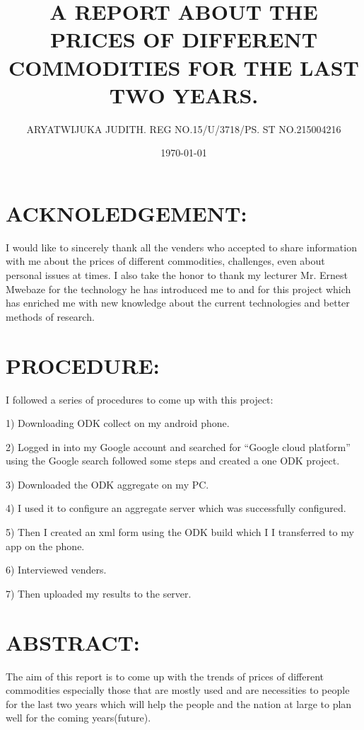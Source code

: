 \documentclass[14pt]{article}
\begin{document}
\title{A REPORT ABOUT THE PRICES OF DIFFERENT COMMODITIES FOR THE LAST TWO YEARS.}
       \author{ ARYATWIJUKA JUDITH.   REG NO.15/U/3718/PS. ST NO.215004216}

\date{\today}
\maketitle
\tableofcontents

\section{ACKNOLEDGEMENT:}
           I would like to sincerely thank all the venders who accepted to share information with me about the prices of different commodities, challenges, even about personal issues at times.
           I also take the honor to thank my lecturer Mr. Ernest Mwebaze for the technology he has introduced me to and for this project which has enriched me with new knowledge about the current technologies and better methods of research.
\section{PROCEDURE:}
I followed a series of procedures to come up with this project:\par
1)	Downloading ODK collect on my android phone.\par
2)	Logged in into my Google account and searched for “Google cloud platform” using the Google search followed some steps and created a one ODK project.\par
3)	Downloaded the ODK aggregate on my PC.\par
4)	I used it to configure an aggregate server which was successfully configured.\par
5)	Then I created an xml form using the ODK build which I I transferred to my app on the phone.\par
6)	Interviewed venders.\par
7)	Then uploaded my results to the server.\par
\section{ABSTRACT:}
The aim of this report is to come up with the trends of prices of different commodities especially those that are mostly used and are necessities to people for the last two years which will help the people and the nation at large to plan well for the coming years(future).
\end{document}
